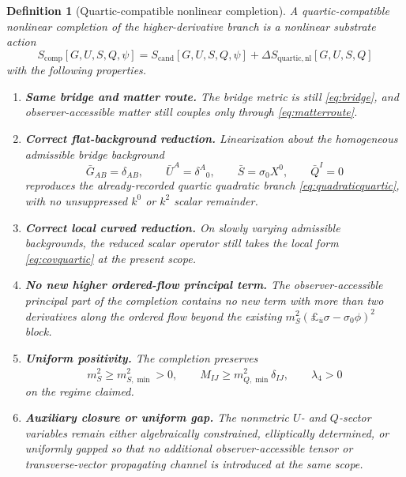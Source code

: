 \documentclass[11pt]{article}
\newtheorem{definition}{Definition}
\begin{document}
\begin{definition}[Quartic-compatible nonlinear completion]
A \emph{quartic-compatible nonlinear completion} of the higher-derivative branch is a nonlinear substrate action
\begin{equation}
S_{\mathrm{comp}}[G,U,S,Q,\psi]
=
S_{\mathrm{cand}}[G,U,S,Q,\psi]
+ \Delta S_{\mathrm{quartic,nl}}[G,U,S,Q]
\label{eq:Scomp}
\end{equation}
with the following properties.
\begin{enumerate}
    \item \textbf{Same bridge and matter route.} The bridge metric is still \eqref{eq:bridge}, and observer-accessible matter still couples only through \eqref{eq:matterroute}.
    \item \textbf{Correct flat-background reduction.} Linearization about the homogeneous admissible bridge background
    \begin{equation}
    \bar G_{AB}=\delta_{AB},
    \qquad
    \bar U^A=\delta^A{}_0,
    \qquad
    \bar S=\sigma_0X^0,
    \qquad
    \bar Q^I=0
    \label{eq:flatbackground}
    \end{equation}
    reproduces the already-recorded quartic quadratic branch \eqref{eq:quadraticquartic}, with no unsuppressed \(k^0\) or \(k^2\) scalar remainder.
    \item \textbf{Correct local curved reduction.} On slowly varying admissible backgrounds, the reduced scalar operator still takes the local form \eqref{eq:covquartic} at the present scope.
    \item \textbf{No new higher ordered-flow principal term.} The observer-accessible principal part of the completion contains no new term with more than two derivatives along the ordered flow beyond the existing \(m_S^2(\pounds_{\bar u}\sigma-\sigma_0\phi)^2\) block.
    \item \textbf{Uniform positivity.} The completion preserves
    \begin{equation}
    m_S^2\ge m_{S,\min}^2>0,
    \qquad
    \widehat M_{IJ}\ge m_{Q,\min}^2\delta_{IJ},
    \qquad
    \lambda_4>0
    \label{eq:positivity}
    \end{equation}
    on the regime claimed.
    \item \textbf{Auxiliary closure or uniform gap.} The nonmetric \(U\)- and \(Q\)-sector variables remain either algebraically constrained, elliptically determined, or uniformly gapped so that no additional observer-accessible tensor or transverse-vector propagating channel is introduced at the same scope.
\end{enumerate}
\end{definition}
\end{document}

